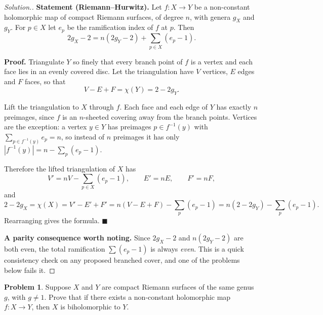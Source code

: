 \documentclass[11pt,a4paper]{article}
\theoremstyle{definition}
\newtheorem{problemx}{Problem}[section]
\newenvironment{problem}{\begin{problemx}}{\end{problemx}}
\newenvironment{solution}
  {\renewcommand{\qedsymbol}{}\begin{proof}[\textit{Solution}.]}
  {\end{proof}}
\begin{document}
\begin{solution}
\textbf{Statement (Riemann--Hurwitz).} Let $f : X \rightarrow Y$ be a non-constant
holomorphic map of compact Riemann surfaces, of degree $n$, with genera $g_X$ and
$g_Y$. For $p \in X$ let $e_p$ be the ramification index of $f$ at $p$. Then
$$2g_X - 2 = n\left(2g_Y - 2\right) + \sum_{p \in X}\left(e_p - 1\right).$$

\textbf{Proof.} Triangulate $Y$ so finely that every branch point of $f$ is a
vertex and each face lies in an evenly covered disc. Let the triangulation have
$V$ vertices, $E$ edges and $F$ faces, so that
$$V - E + F = \chi(Y) = 2 - 2g_Y .$$

Lift the triangulation to $X$ through $f$. Each face and each edge of $Y$ has
exactly $n$ preimages, since $f$ is an $n$-sheeted covering away from the branch
points. Vertices are the exception: a vertex $y \in Y$ has preimages
$p \in f^{-1}(y)$ with $\sum_{p \in f^{-1}(y)} e_p = n$, so instead of $n$
preimages it has only $\left|f^{-1}(y)\right| = n - \sum_{p}(e_p - 1)$.

Therefore the lifted triangulation of $X$ has
$$V' = nV - \sum_{p\in X}(e_p-1),\qquad E' = nE,\qquad F' = nF,$$
and
$$2 - 2g_X = \chi(X) = V' - E' + F'
= n\left(V-E+F\right) - \sum_{p}(e_p-1)
= n\left(2-2g_Y\right) - \sum_{p}(e_p-1).$$
Rearranging gives the formula. $\blacksquare$

\textbf{A parity consequence worth noting.} Since $2g_X - 2$ and $n(2g_Y-2)$ are
both even, the total ramification $\sum(e_p-1)$ is always \emph{even}. This is a
quick consistency check on any proposed branched cover, and one of the problems
below fails it.
\end{solution}


\begin{problem}
Suppose $X$ and $Y$ are compact Riemann surfaces of the same genus $g$, with
$g \neq 1$. Prove that if there exists a non-constant holomorphic map
$f : X \rightarrow Y$, then $X$ is biholomorphic to $Y$.
\end{problem}
\end{document}
